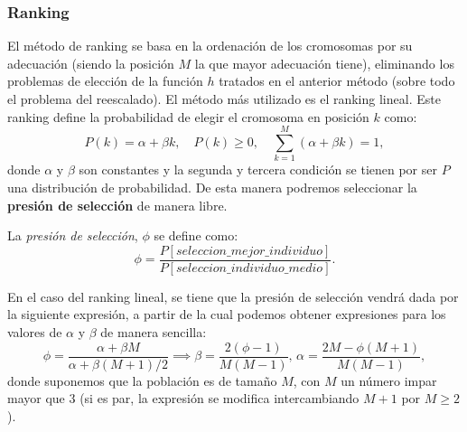 \subsubsection{Ranking}
El método de ranking se basa en la ordenación de los cromosomas por su adecuación (siendo la posición $M$ la que mayor adecuación tiene), eliminando los problemas de elección de la función $h$ tratados en el anterior método (sobre todo el problema del reescalado). El método más utilizado es el ranking lineal. Este ranking define la probabilidad de elegir el cromosoma en posición $k$ como:
$$P(k)=\alpha+\beta k,\quad P(k)\geq0,\quad \sum_{k=1}^M(\alpha+\beta k)=1,$$
donde $\alpha$ y $\beta$ son constantes y la segunda y tercera condición se tienen por ser $P$ una distribución de probabilidad. De esta manera podremos seleccionar la \textbf{presión de selección} de manera libre.

\begin{definition}
    La \textit{presión de selección}, $\phi$ se define como:
    $$\phi = \frac{P[seleccion\_mejor\_individuo]}{P[seleccion\_individuo\_medio]}.$$
\end{definition}
En el caso del ranking lineal, se tiene que la presión de selección vendrá dada por la siguiente expresión, a partir de la cual podemos obtener expresiones para los valores de $\alpha$ y $\beta$ de manera sencilla:
\begin{equation}\label{eq:alfabeta}
    \phi=\frac{\alpha+\beta M}{\alpha+\beta(M+1)/2}\implies \beta =\frac{2(\phi-1)}{M(M-1)},\,\alpha=\frac{2M-\phi(M+1)}{M(M-1)},
\end{equation}
donde suponemos que la población es de tamaño $M$, con $M$ un número impar mayor que $3$ (si es par, la expresión se modifica intercambiando $M+1$ por $M\geq2$).\\

